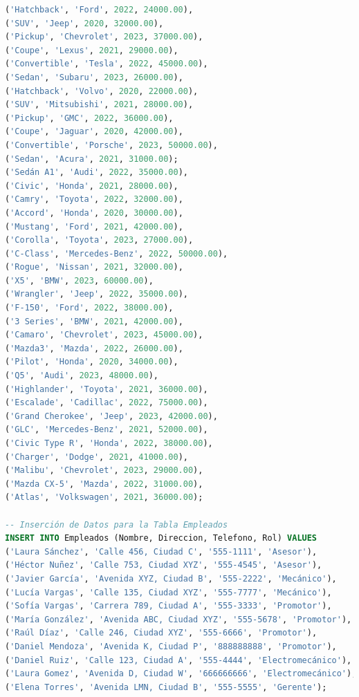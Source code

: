 \documentclass[12pt]{article}
\begin{document}
\begin{lstlisting}[language=SQL]
('Hatchback', 'Ford', 2022, 24000.00),
('SUV', 'Jeep', 2020, 32000.00),
('Pickup', 'Chevrolet', 2023, 37000.00),
('Coupe', 'Lexus', 2021, 29000.00),
('Convertible', 'Tesla', 2022, 45000.00),
('Sedan', 'Subaru', 2023, 26000.00),
('Hatchback', 'Volvo', 2020, 22000.00),
('SUV', 'Mitsubishi', 2021, 28000.00),
('Pickup', 'GMC', 2022, 36000.00),
('Coupe', 'Jaguar', 2020, 42000.00),
('Convertible', 'Porsche', 2023, 50000.00),
('Sedan', 'Acura', 2021, 31000.00);
('Sedán A1', 'Audi', 2022, 35000.00),
('Civic', 'Honda', 2021, 28000.00),
('Camry', 'Toyota', 2022, 32000.00),
('Accord', 'Honda', 2020, 30000.00),
('Mustang', 'Ford', 2021, 42000.00),
('Corolla', 'Toyota', 2023, 27000.00),
('C-Class', 'Mercedes-Benz', 2022, 50000.00),
('Rogue', 'Nissan', 2021, 32000.00),
('X5', 'BMW', 2023, 60000.00),
('Wrangler', 'Jeep', 2022, 35000.00),
('F-150', 'Ford', 2022, 38000.00),
('3 Series', 'BMW', 2021, 42000.00),
('Camaro', 'Chevrolet', 2023, 45000.00),
('Mazda3', 'Mazda', 2022, 26000.00),
('Pilot', 'Honda', 2020, 34000.00),
('Q5', 'Audi', 2023, 48000.00),
('Highlander', 'Toyota', 2021, 36000.00),
('Escalade', 'Cadillac', 2022, 75000.00),
('Grand Cherokee', 'Jeep', 2023, 42000.00),
('GLC', 'Mercedes-Benz', 2021, 52000.00),
('Civic Type R', 'Honda', 2022, 38000.00),
('Charger', 'Dodge', 2021, 41000.00),
('Malibu', 'Chevrolet', 2023, 29000.00),
('Mazda CX-5', 'Mazda', 2022, 31000.00),
('Atlas', 'Volkswagen', 2021, 36000.00);

-- Inserción de Datos para la Tabla Empleados
INSERT INTO Empleados (Nombre, Direccion, Telefono, Rol) VALUES
('Laura Sánchez', 'Calle 456, Ciudad C', '555-1111', 'Asesor'),
('Héctor Nuñez', 'Calle 753, Ciudad XYZ', '555-4545', 'Asesor'),
('Javier García', 'Avenida XYZ, Ciudad B', '555-2222', 'Mecánico'),
('Lucía Vargas', 'Calle 135, Ciudad XYZ', '555-7777', 'Mecánico'),
('Sofía Vargas', 'Carrera 789, Ciudad A', '555-3333', 'Promotor'),
('María González', 'Avenida ABC, Ciudad XYZ', '555-5678', 'Promotor'),
('Raúl Díaz', 'Calle 246, Ciudad XYZ', '555-6666', 'Promotor'),
('Daniel Mendoza', 'Avenida K, Ciudad P', '888888888', 'Promotor'),
('Daniel Ruiz', 'Calle 123, Ciudad A', '555-4444', 'Electromecánico'),
('Laura Gomez', 'Avenida D, Ciudad W', '666666666', 'Electromecánico'),
('Elena Torres', 'Avenida LMN, Ciudad B', '555-5555', 'Gerente');


\end{lstlisting}
\end{document}
